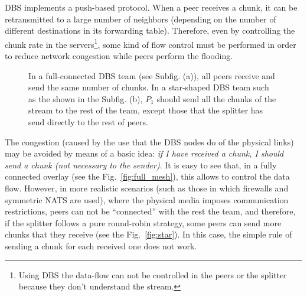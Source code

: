
\label{sec:chunk_flooding}

\begin{comment}
\begin{figure*}
  \imgw{300}{graphics/peer_chunk_flooding.svg}
  \caption{Chunk flooding at peers.\label{fig:peer_chunk_flooding}}
\end{figure*}
\end{comment}

DBS implements a push-based protocol. When a peer receives a chunk, it
can be retransmitted to a large number of neighbors (depending on the
number of different destinations in its forwarding table). Therefore,
even by controlling the chunk rate in the servers\footnote{Using DBS
  the data-flow can not be controlled in the peers or the splitter
  because they don't understand the stream.}, some kind of flow
control must be performed in order to reduce network congestion while
peers perform the flooding.


\begin{figure*}
  \centering
  \quad
  \caption{In a full-connected DBS team (see Subfig. (a)), all peers
    receive and send the same number of chunks. In a star-shaped DBS
    team such as the shown in the Subfig. (b), $P_1$ should send all
    the chunks of the stream to the rest of the team, except those
    that the splitter has send directly to the rest of peers.}
\end{figure*}

The congestion (caused by the use that the DBS nodes do of the
physical links) may be avoided by means of a basic idea: \textit{if I
  have received a chunk, I should send a chunk (not necessary to the
  sender)}. It is easy to see that, in a fully connected overlay (see
the Fig.~\ref{fig:full_mesh}), this allows to control the data
flow. However, in more realistic scenarios (such as those in which
firewalls and symmetric NATS are used), where the physical media
imposes communication restrictions, peers can not be ``connected''
with the rest the team, and therefore, if the splitter follows a pure
round-robin strategy, some peers can send more chunks that they
receive (see the Fig.~\ref{fig:star}). In this case, the simple rule
of sending a chunk for each received one does not work.


